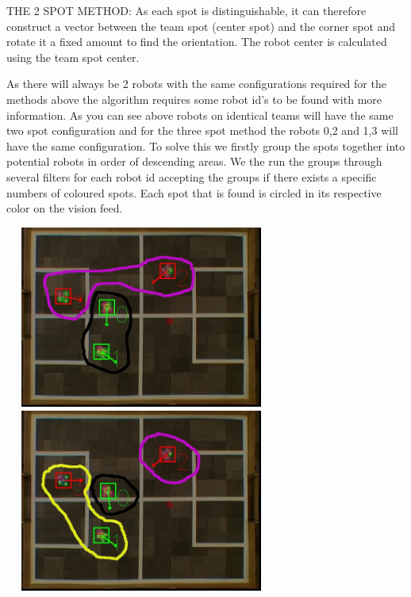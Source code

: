 \documentclass[a4paper,12pt]{article}
\begin{document}
\begin{minipage}{0.8\textwidth}\raggedleft 
THE 2 SPOT METHOD: As each spot is distinguishable, it can therefore construct a vector between the team spot (center spot) and the corner spot and rotate it a fixed amount to find the orientation. The robot center is calculated using the team spot center. 
\end{minipage}\newline \newline
As there will always be 2 robots with the same configurations required for the methods above the algorithm requires some robot id's to be found with more information. As you can see above robots on identical teams will have the same two spot configuration and for the three spot method the robots 0,2 and 1,3 will have the same configuration. To solve this we firstly group the spots together into potential robots in order of descending areas. We the run the groups through several filters for each robot id accepting the groups if there exists a specific numbers of coloured spots. Each spot that is found is circled in its respective color on the vision feed.\newline\newline
\begin{minipage}{0.7\textwidth}
\includegraphics[height=60mm,width=90mm]{filter1.jpg}\newline\newline
\includegraphics[height=60mm,width=90mm]{filter2.jpg}
\end{minipage}
\end{document}
